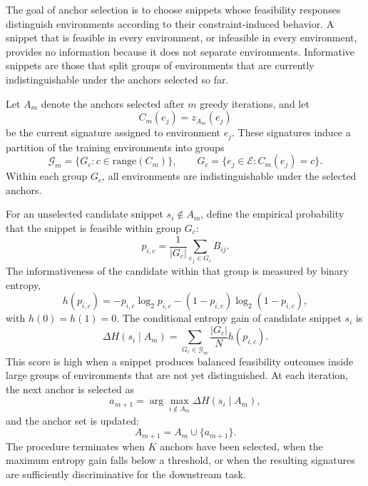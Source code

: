 The goal of anchor selection is to choose snippets whose feasibility responses distinguish environments according to their constraint-induced behavior. A snippet that is feasible in every environment, or infeasible in every environment, provides no information because it does not separate environments. Informative snippets are those that split groups of environments that are currently indistinguishable under the anchors selected so far.

Let $A_m$ denote the anchors selected after $m$ greedy iterations, and let
%
\begin{equation}
C_m(e_j)=z_{A_m}(e_j)
\end{equation}
%
be the current signature assigned to environment $e_j$. These signatures induce a partition of the training environments into groups
%
\begin{equation}
\mathcal{G}_m = \{G_c : c \in \mathrm{range}(C_m)\},
\qquad
G_c = \{e_j \in \mathcal{E} : C_m(e_j)=c\}.
\end{equation}
%
Within each group $G_c$, all environments are indistinguishable under the selected anchors.

For an unselected candidate snippet $s_i\notin A_m$, define the empirical probability that the snippet is feasible within group $G_c$:
%
\begin{equation}
p_{i,c}
=
\frac{1}{|G_c|}
\sum_{e_j\in G_c} B_{ij}.
\end{equation}
%
The informativeness of the candidate within that group is measured by binary entropy,
%
\begin{equation}
h(p_{i,c})
=
-p_{i,c}\log_2 p_{i,c}
-(1-p_{i,c})\log_2(1-p_{i,c}),
\end{equation}
%
with $h(0)=h(1)=0$. The conditional entropy gain of candidate snippet $s_i$ is
%
\begin{equation}
\Delta H(s_i\mid A_m)
=
\sum_{G_c\in\mathcal{G}_m}
\frac{|G_c|}{N}
h(p_{i,c}).
\end{equation}
%
This score is high when a snippet produces balanced feasibility outcomes inside large groups of environments that are not yet distinguished. At each iteration, the next anchor is selected as
%
\begin{equation}
a_{m+1}
=
\arg\max_{i\notin A_m}
\Delta H(s_i\mid A_m),
\end{equation}
%
and the anchor set is updated:
%
\begin{equation}
A_{m+1}=A_m\cup\{a_{m+1}\}.
\end{equation}
%
The procedure terminates when $K$ anchors have been selected, when the maximum entropy gain falls below a threshold, or when the resulting signatures are sufficiently discriminative for the downstream task.

